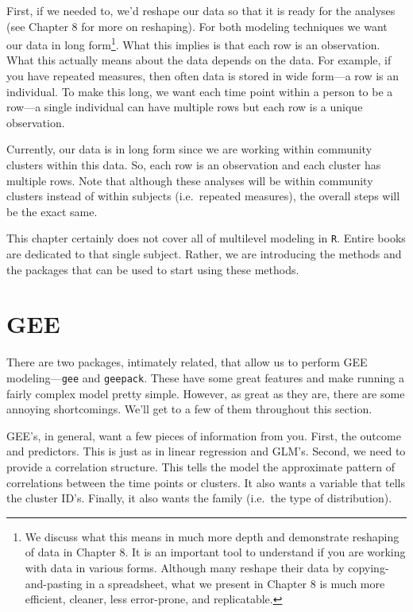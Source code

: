 \documentclass[]{tufte-book}
\theoremstyle{definition}
\theoremstyle{definition}
\theoremstyle{remark}
\begin{document}
First, if we needed to, we'd reshape our data so that it is ready for
the analyses (see Chapter 8 for more on reshaping). For both modeling
techniques we want our data in long form\footnote{We discuss what this
  means in much more depth and demonstrate reshaping of data in Chapter
  8. It is an important tool to understand if you are working with data
  in various forms. Although many reshape their data by
  copying-and-pasting in a spreadsheet, what we present in Chapter 8 is
  much more efficient, cleaner, less error-prone, and replicatable.}.
What this implies is that each row is an observation. What this actually
means about the data depends on the data. For example, if you have
repeated measures, then often data is stored in wide form---a row is an
individual. To make this long, we want each time point within a person
to be a row---a single individual can have multiple rows but each row is
a unique observation.

Currently, our data is in long form since we are working within
community clusters within this data. So, each row is an observation and
each cluster has multiple rows. Note that although these analyses will
be within community clusters instead of within subjects (i.e.~repeated
measures), the overall steps will be the exact same.

This chapter certainly does not cover all of multilevel modeling in
\texttt{R}. Entire books are dedicated to that single subject. Rather,
we are introducing the methods and the packages that can be used to
start using these methods.

\section*{GEE}\label{gee}

There are two packages, intimately related, that allow us to perform GEE
modeling---\texttt{gee} and \texttt{geepack}. These have some great
features and make running a fairly complex model pretty simple. However,
as great as they are, there are some annoying shortcomings. We'll get to
a few of them throughout this section.

GEE's, in general, want a few pieces of information from you. First, the
outcome and predictors. This is just as in linear regression and GLM's.
Second, we need to provide a correlation structure. This tells the model
the approximate pattern of correlations between the time points or
clusters. It also wants a variable that tells the cluster ID's. Finally,
it also wants the family (i.e.~the type of distribution).
\end{document}
